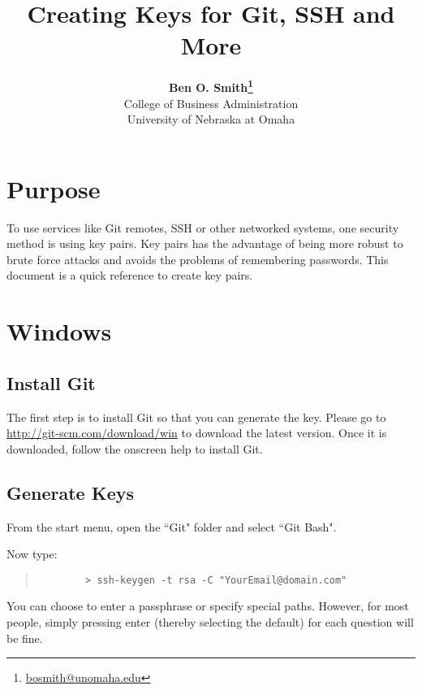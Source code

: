 \documentclass[11pt]{article}
\begin{document}
 

\title{Creating Keys for Git, SSH and More}
\date{}
\author{\textbf{Ben O. Smith\footnote{\href{mailto:bosmith@unomaha.edu}{bosmith@unomaha.edu}}} \\
College of Business Administration \\
University of Nebraska at Omaha}
\maketitle \doublespace

\section*{Purpose}

To use services like Git remotes, SSH or other networked systems, one security method is using key pairs.  Key pairs has the advantage of being more robust to brute force attacks and avoids the problems of remembering passwords.  This document is a quick reference to create key pairs.

\section{Windows}

\subsection{Install Git}

The first step is to install Git so that you can generate the key.  Please go to \href{http://git-scm.com/download/win}{http://git-scm.com/download/win} to download the latest version.  Once it is downloaded, follow the onscreen help to install Git.

\subsection{Generate Keys}

From the start menu, open the ``Git" folder and select ``Git Bash".
	
Now type:

\begin{quote}
	\begin{verbatim}
		> ssh-keygen -t rsa -C "YourEmail@domain.com"
	\end{verbatim}
\end{quote}

You can choose to enter a passphrase or specify special paths.  However, for most people, simply pressing enter (thereby selecting the default) for each question will be fine.
\end{document}
